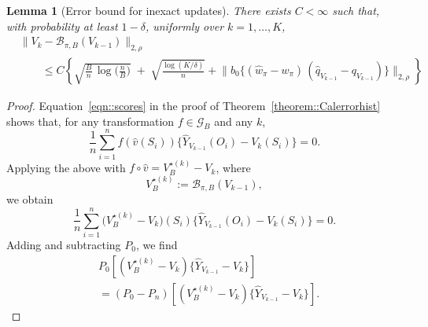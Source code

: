 \documentclass{article}
\theoremstyle{plain}
\newtheorem{lemma}{Lemma}
\theoremstyle{definition}
\theoremstyle{remark}
\begin{document}
\begin{lemma}[Error bound for inexact updates]
\label{lemma::errorperiter}
There exists \(C<\infty\) such that, with probability at least \(1-\delta\),
uniformly over \(k=1,\ldots,K\),
 \begin{align*}
&\|V_k -
  \mathcal B_{\pi,B}(V_{k-1})\|_{2,\rho}\\
 & \qquad \leq
C\left\{
\sqrt{\frac{B}{n}\,\log\Big(\frac{n}{B}\Big)}
\;+\;
\sqrt{\frac{\log(K/\delta)}{n}}
+
\big\|
b_0\{(\widehat w_{\pi} - w_{\pi})\,
(\widehat q_{V_{k-1}} - q_{V_{k-1}})\}
\big\|_{2,\rho}
\right\}
\end{align*}
 \end{lemma}
\begin{proof}
Equation~\ref{eqn::scores} in the proof of Theorem~\ref{theorem::Calerrorhist} shows that, for any transformation $f \in \mathcal G_B$ and any $k$,
\begin{equation*}
\frac{1}{n}\sum_{i=1}^n 
f(\hat{v}(S_i))
\big\{
\widehat Y_{V_{k-1}}(O_i)
- V_k(S_i)
\big\}
= 0.
\end{equation*}
Applying the above with 
$f \circ \hat{v} = V_B^{\star(k)} - V_k$, 
where 
\[
V_B^{\star(k)} := \mathcal B_{\pi,B}(V_{k-1}),
\]
we obtain
\begin{equation*}
\frac{1}{n}\sum_{i=1}^n 
\big(V_B^{\star(k)} - V_k\big)(S_i)
\Big\{
\widehat Y_{V_{k-1}}(O_i)
-
V_k(S_i)
\Big\}
= 0.
\end{equation*}
Adding and subtracting $P_0$, we find
\begin{equation}
\begin{aligned}
&P_0\left[
  (V_B^{\star(k)} - V_k)
  \Big\{
    \widehat Y_{V_{k-1}}
    - V_k
  \Big\}
\right]\\
&=
(P_0 - P_n)\left[
  (V_B^{\star(k)} - V_k)
  \Big\{
    \widehat Y_{V_{k-1}}
    - V_k
  \Big\}
\right].
\end{aligned}
\label{eq:pn_p0_identity}
\end{equation}


\end{proof}
\end{document}
